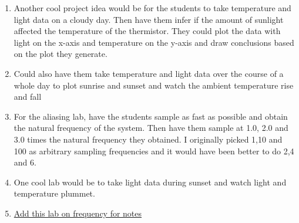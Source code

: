 \documentclass{article}
\begin{document}
\begin{enumerate}[itemsep=-5pt]
\item Another cool project idea would be for the students to take temperature and light data on a cloudy day. Then have them infer if the amount of sunlight affected the temperature of the thermistor. They could plot the data with light on the x-axis and temperature on the y-axis and draw conclusions based on the plot they generate.
\item Could also have them take temperature and light data over the course of a whole day to plot sunrise and sunset and watch the ambient temperature rise and fall
\item For the aliasing lab, have the students sample as fast as possible and obtain the natural frequency of the system. Then have them sample at 1.0, 2.0 and 3.0 times the natural frequency they obtained. I originally picked 1,10 and 100 as arbitrary sampling frequencies and it would have been better to do 2,4 and 6.
\item One cool lab would be to take light data during sunset and watch light and temperature plummet.
\item \href{https://learn.adafruit.com/circuit-playground-o-phonor/musical-note-basics}{Add this lab on frequency for notes}
\end{enumerate}

\newpage


































\end{document}
